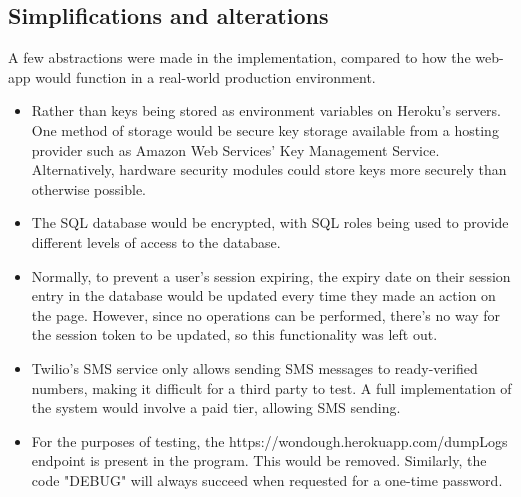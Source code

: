 \subsection{Simplifications and alterations}

A few abstractions were made in the implementation, compared to how the web-app would function in a real-world production environment. 

\begin{itemize}

    \item Rather than keys being stored as environment variables on Heroku's servers. One method of storage would be secure key storage available from a hosting provider such as Amazon Web Services' Key Management Service. Alternatively, hardware security modules could store keys more securely than otherwise possible.

    \item The SQL database would be encrypted, with SQL roles being used to provide different levels of access to the database.

    \item Normally, to prevent a user's session expiring, the expiry date on their session entry in the database would be updated every time they made an action on the page. However, since no operations can be performed, there's no way for the session token to be updated, so this functionality was left out.

    \item Twilio's SMS service only allows sending SMS messages to ready-verified numbers, making it difficult for a third party to test. A full implementation of the system would involve a paid tier, allowing SMS sending.

    \item For the purposes of testing, the {https://wondough.herokuapp.com/dumpLogs} endpoint is present in the program. This would be removed. Similarly, the code "DEBUG" will always succeed when requested for a one-time password. 

\end{itemize}